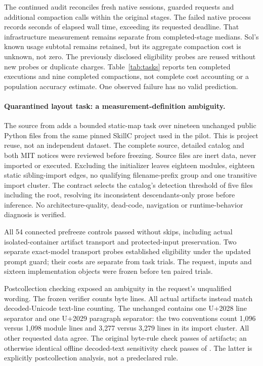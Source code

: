 The continued audit reconciles \InstructionSessions{} fresh native sessions,
\InstructionNativeRequests{} guarded requests and \InstructionRepairs{}
additional compaction calls within the original stages. The failed native
process records \InstructionFailedNativeSeconds{} seconds of elapsed wall
time, exceeding its requested deadline. That infrastructure measurement
remains separate from completed-stage medians. Sol's known usage subtotal
remains retained, but its aggregate compaction cost is unknown, not zero.
The previously disclosed eligibility probes are reused without new probes
or duplicate charges. Table~\ref{tab:tasks} reports ten completed
executions and nine completed compactions, not complete cost accounting or a
population accuracy estimate. One observed failure has no valid prediction.

\paragraph{Quarantined layout task: a measurement-definition ambiguity.}
The  source from  adds a
bounded static-map task over nineteen unchanged public Python files from
the same pinned SkillC project used in the pilot. This is project reuse,
not an independent dataset. The complete source, detailed catalog and both
MIT notices were reviewed before freezing. Source files are inert data,
never imported or executed. Excluding the initializer leaves eighteen
modules, eighteen static sibling-import edges, no qualifying filename-prefix
group and one transitive import cluster. The contract selects the catalog's
detection threshold of five files including the root, resolving its
inconsistent descendants-only prose before inference. No architecture-quality,
dead-code, navigation or runtime-behavior diagnosis is verified.

All 54 connected prefreeze controls passed without skips, including actual
isolated-container artifact transport and protected-input preservation. Two
separate exact-model transport probes established eligibility under the updated
prompt guard; their costs are separate from task trials. The request, inputs
and sixteen implementation objects were frozen before ten paired trials.

Postcollection checking exposed an ambiguity in the request's unqualified
 wording. The frozen verifier counts byte lines. All actual
artifacts instead match decoded-Unicode text-line counting. The unchanged
 contains one U+2028 line separator and one U+2029 paragraph
separator: the two conventions count 1,096 versus 1,098 module lines and
3,277 versus 3,279 lines in its import cluster. All other requested data agree.
The original byte-rule check passes \LayoutBytePassed{} of
\LayoutExecutions{} artifacts; an otherwise identical offline decoded-text
sensitivity check passes \LayoutTextPassed{} of \LayoutExecutions{}.
The latter is explicitly postcollection analysis, not a predeclared rule.

